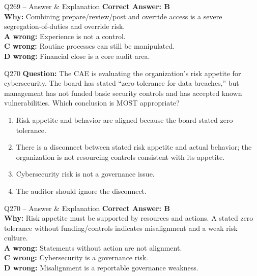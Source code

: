 \documentclass[aspectratio=169,10pt]{beamer}
\begin{document}
	\begin{frame}[t]{Q269 -- Answer \& Explanation}
		\small
		\textbf{Correct Answer: B} \\[4pt]
		\textbf{Why:} Combining prepare/review/post and override access is a severe segregation-of-duties and override risk. \\[4pt]
		\textbf{A wrong:} Experience is not a control. \\[2pt]
		\textbf{C wrong:} Routine processes can still be manipulated. \\[2pt]
		\textbf{D wrong:} Financial close is a core audit area.
	\end{frame}
	
	\begin{frame}[t]{Q270}
		\small
		\textbf{Question:} The CAE is evaluating the organization's risk appetite for cybersecurity. The board has stated ``zero tolerance for data breaches,'' but management has not funded basic security controls and has accepted known vulnerabilities. Which conclusion is MOST appropriate?
		\begin{enumerate}[label=\Alph*.,itemsep=1pt,topsep=2pt]
			\item Risk appetite and behavior are aligned because the board stated zero tolerance.
			\item There is a disconnect between stated risk appetite and actual behavior; the organization is not resourcing controls consistent with its appetite.
			\item Cybersecurity risk is not a governance issue.
			\item The auditor should ignore the disconnect.
		\end{enumerate}
	\end{frame}
	
	\begin{frame}[t]{Q270 -- Answer \& Explanation}
		\small
		\textbf{Correct Answer: B} \\[4pt]
		\textbf{Why:} Risk appetite must be supported by resources and actions. A stated zero tolerance without funding/controls indicates misalignment and a weak risk culture. \\[4pt]
		\textbf{A wrong:} Statements without action are not alignment. \\[2pt]
		\textbf{C wrong:} Cybersecurity is a governance risk. \\[2pt]
		\textbf{D wrong:} Misalignment is a reportable governance weakness.
	\end{frame}
	
\end{document}

